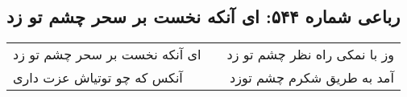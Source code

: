 \begin{center}
\section*{رباعی شماره ۵۴۴: ای آنکه نخست بر سحر چشم تو زد}
\label{sec:0544}
\begin{longtable}{l p{0.5cm} r}
ای آنکه نخست بر سحر چشم تو زد
&&
وز با نمکی راه نظر چشم تو زد
\\
آنکس که چو توتیاش عزت داری
&&
آمد به طریق شکرم چشم توزد
\\
\end{longtable}
\end{center}

